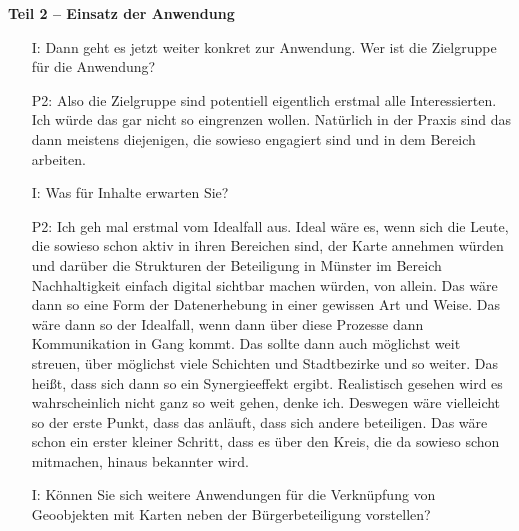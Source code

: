 \textbf{Teil 2 -- Einsatz der Anwendung}
\begin{itemize}
    \item[I:] Dann geht es jetzt weiter konkret zur Anwendung. Wer ist die Zielgruppe f{\"u}r die Anwendung?
    \item[P2:] Also die Zielgruppe sind potentiell eigentlich erstmal alle Interessierten. Ich w{\"u}rde das gar nicht so eingrenzen wollen. Nat{\"u}rlich in der Praxis sind das dann meistens diejenigen, die sowieso engagiert sind und in dem Bereich arbeiten.
    \item[I:] Was f{\"u}r Inhalte erwarten Sie?
    \item[P2:] Ich geh mal erstmal vom Idealfall aus. Ideal w{\"a}re es, wenn sich die Leute, die sowieso schon aktiv in ihren Bereichen sind, der Karte annehmen w{\"u}rden und dar{\"u}ber die Strukturen der Beteiligung in M{\"u}nster im Bereich Nachhaltigkeit einfach digital sichtbar machen w{\"u}rden, von allein. Das w{\"a}re dann so eine Form der Datenerhebung in einer gewissen Art und Weise. Das w{\"a}re dann so der Idealfall, wenn dann {\"u}ber diese Prozesse dann Kommunikation in Gang kommt. Das sollte dann auch m{\"o}glichst weit streuen, {\"u}ber m{\"o}glichst viele Schichten und Stadtbezirke und so weiter. Das hei{\ss}t, dass sich dann so ein Synergieeffekt ergibt. Realistisch gesehen wird es wahrscheinlich nicht ganz so weit gehen, denke ich. Deswegen w{\"a}re vielleicht so der erste Punkt, dass das anl{\"a}uft, dass sich andere beteiligen. Das w{\"a}re schon ein erster kleiner Schritt, dass es {\"u}ber den Kreis, die da sowieso schon mitmachen, hinaus bekannter wird.
    \item[I:] K{\"o}nnen Sie sich weitere Anwendungen f{\"u}r die Verkn{\"u}pfung von Geoobjekten mit Karten neben der B{\"u}rgerbeteiligung vorstellen?

\end{itemize}
